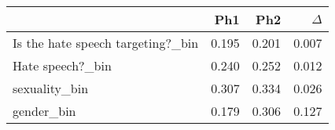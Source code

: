 \begin{tabular}{lrrr}
\toprule
 & Ph1 & Ph2 & $\Delta$ \\
\midrule
Is the hate speech targeting?_bin & 0.195 & 0.201 & 0.007 \\
Hate speech?_bin & 0.240 & 0.252 & 0.012 \\
sexuality_bin & 0.307 & 0.334 & 0.026 \\
gender_bin & 0.179 & 0.306 & 0.127 \\
\bottomrule
\end{tabular}
